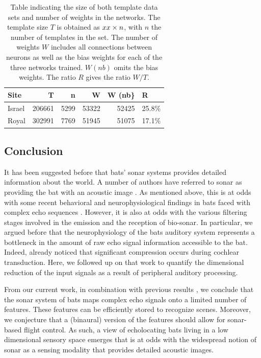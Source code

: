 \documentclass[preprint,5p]{elsarticle}
\begin{document}
\begin{table}
	\centering
\begin{tabular}{lrrrrl}
	\toprule
	Site &       T &     n &      W &  W (nb\} &      R \\
	\midrule
	Israel &  206661 &  5299 &  53322 &   52425 &  25.8\% \\
	Royal &  302991 &  7769 &  51945 &   51075 &  17.1\% \\
	\bottomrule
\end{tabular}
	\label{tab:sizes}
	\caption{Table indicating the size of both template data sets and number of weights in the networks. The template size $T$ is obtained as $xx \times n$, with $n$ the number of templates in the set. The number of weights $W$ includes all connections between neurons as well as the bias weights for each of the three networks trained. $W (nb)$ omits the bias weights. The ratio $R$ gives the ratio $W/T$.}
\end{table}


\subsection{Conclusion}

It has been suggested before that bats' sonar systems provides detailed information about the world. A number of authors have referred to sonar as providing the bat with an acoustic image \citep{Lee2017,Barchi2013,Moss2001,Schnitzler2003,Simmons2012,Ulanovsky2008,Clare2015,Surlykke2016,Geipel2013}. As mentioned above, this is at odds with some recent behavioral and neurophysiological findings in bats faced with complex echo sequences \citep{Knowles2015,Geberl2013,Warnecke2018}. However, it is also at odds with the various filtering stages involved in the emission and the reception of bio-sonar. In particular, we argued before that the neurophysiology of the  bats auditory system represents a bottleneck in the amount of raw echo signal information accessible to the bat. Indeed, \citet{Reijniers2010a} already noticed that significant compression occurs during cochlear transduction. Here, we followed up on that work to quantify the dimensional reduction of the input signals as a result of peripheral auditory processing.

From our current work, in combination with previous results \citep{Vanderelst2016,Vanderelst2015a,Mansour2019,Reijniers2010a}, we conclude that the sonar system of bats maps complex echo signals onto a limited number of features. These features can be efficiently stored to recognize scenes. Moreover, we conjecture that a (binaural) version of the features should allow for sonar-based flight control. As such, a view of echolocating bats living in a low dimensional sensory space emerges that is at odds with the widespread notion of sonar as a sensing modality that provides detailed acoustic images.
\end{document}

